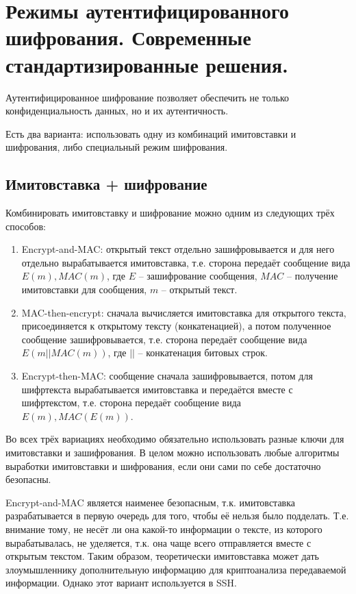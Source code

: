 \section{Режимы аутентифицированного шифрования. Современные стандартизированные решения.}

Аутентифицированное шифрование позволяет обеспечить не только конфиденциальность данных, но и их аутентичность. 

Есть два варианта: использовать одну из комбинаций имитовставки и шифрования, либо специальный режим шифрования. 

\subsection{Имитовставка + шифрование}

Комбинировать имитовставку и шифрование можно одним из следующих трёх способов:

\begin{enumerate}
	\item Encrypt-and-MAC: открытый текст отдельно зашифровывается и для него отдельно вырабатывается имитовставка, т.е. сторона передаёт сообщение вида $E(m), MAC(m)$, где $E$ -- зашифрование сообщения, $MAC$ -- получение имитовставки для сообщения, $m$ -- открытый текст. 
	\item MAC-then-encrypt: сначала вычисляется имитовставка для открытого текста, присоединяется к открытому тексту (конкатенацией), а потом полученное сообщение зашифровывается, т.е. сторона передаёт сообщение вида $E(m || MAC(m))$, где $||$ -- конкатенация битовых строк. 
	\item Encrypt-then-MAC: сообщение сначала зашифровывается, потом для шифртекста вырабатывается имитовставка и передаётся вместе с шифртекстом, т.е. сторона передаёт сообщение вида $E(m), MAC(E(m))$.
\end{enumerate}

Во всех трёх вариациях необходимо обязательно использовать разные ключи для имитовставки и зашифрования. В целом можно использовать любые алгоритмы выработки имитовставки и шифрования, если они сами по себе достаточно безопасны. 

Encrypt-and-MAC является наименее безопасным, т.к. имитовставка разрабатывается в первую очередь для того, чтобы её нельзя было подделать. Т.е. внимание тому, не несёт ли она какой-то информации о тексте, из которого вырабатывалась, не уделяется, т.к. она чаще всего отправляется вместе с открытым текстом. Таким образом, теоретически имитовставка может дать злоумышленнику дополнительную информацию для криптоанализа передаваемой информации. Однако этот вариант используется в SSH.

